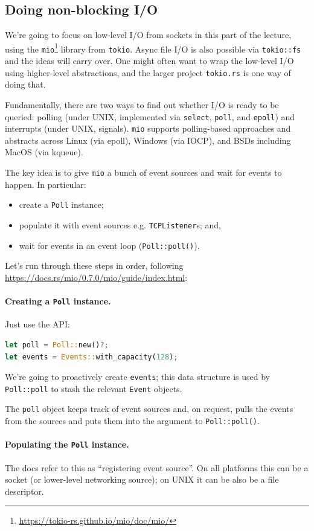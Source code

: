 \subsection*{Doing non-blocking I/O}
We're going to focus on low-level I/O from sockets in this part of the lecture,
using the \texttt{mio}\footnote{\url{https://tokio-rs.github.io/mio/doc/mio/}} library from \texttt{tokio}. Async file I/O is
also possible via \texttt{tokio::fs} and the ideas will carry over.
One might often want to wrap the low-level I/O using higher-level
abstractions, and the larger project \texttt{tokio.rs} is one way of
doing that.

Fundamentally,
there are two ways to find out whether I/O is ready to be queried:
polling (under UNIX, implemented via {\tt select}, {\tt poll}, and
{\tt epoll}) and interrupts (under UNIX, signals). \texttt{mio}
supports polling-based approaches and abstracts across Linux (via
epoll), Windows (via IOCP), and BSDs including MacOS (via kqueue).

The key idea is to give {\tt mio} a bunch of event sources and
wait for events to happen. In particular:
     \begin{itemize}[noitemsep,topsep=-1em]
       \item create a \texttt{Poll} instance;
       \item populate it with event sources e.g. \texttt{TCPListener}s; and,
       \item wait for events in an event loop ({\tt Poll::poll()}).
     \end{itemize}
Let's run through these steps in order, following \url{https://docs.rs/mio/0.7.0/mio/guide/index.html}:

\paragraph{Creating a {\tt Poll} instance.} Just use the API:
    \begin{lstlisting}[language=Rust]
let poll = Poll::new()?;
let events = Events::with_capacity(128);
    \end{lstlisting}
We're going to proactively create \texttt{events}; this data structure is used by
\texttt{Poll::poll} to stash the relevant \texttt{Event} objects.

The \texttt{poll} object keeps track of event sources and,
on request, pulls the events from the sources and puts them
into the argument to \texttt{Poll::poll()}.

\paragraph{Populating the {\tt Poll} instance.} The docs refer
to this as ``registering event source''. On all platforms this can be
a socket (or lower-level networking source); on UNIX it can be also be
a file descriptor.


